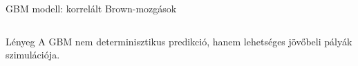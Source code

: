 \documentclass[aspectratio=169,11pt]{beamer}
\begin{document}
\begin{frame}{GBM modell: korrelált Brown-mozgások}
\begin{columns}[T, onlytextwidth]
\end{columns}

\vspace{-0.1cm} %

\begin{center}
  \begin{minipage}{0.94\textwidth}
    \begin{block}{Lényeg}
      A GBM nem determinisztikus predikció, hanem lehetséges jövőbeli pályák szimulációja.
    \end{block}
  \end{minipage}
\end{center}
\end{frame}

\end{document}
